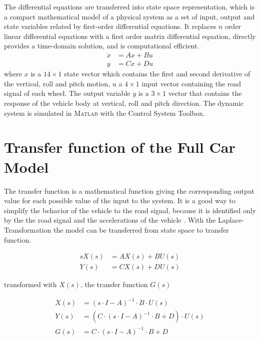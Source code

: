  The differential equations are transferred into state space representation, which is a compact mathematical model of a physical system as a set of input, output and state variables related by first-order differential equations.
 It replaces $n$ order linear differential equations with a first order matrix differential equation, directly provides a time-domain solution, and is computational efficient.
 \begin{align}
     \dot{x}&=Ax+Bu\\
     y&=Cx+Du 
 \end{align}
 where $x$ is a $14\times1$ state vector which contains the first and second derivative of the vertical, roll and pitch motion, $u$ a $4\times1$ input vector containing the road signal of each wheel. 
 The output variable $y$ is a $3\times1$ vector that contains the response of the vehicle body at vertical, roll and pitch direction.
 The dynamic system is simulated in \textsc{Matlab} with the Control System Toolbox.


 \section{Transfer function of the Full Car Model}
 \label{sec:tf}
 
 The transfer function is a mathematical function giving the corresponding output value for each possible value of the input to the system.
 It is a good way to simplify the behavior of the vehicle to the road signal, because it is identified only by the the road signal and the accelerations of the vehicle \cite{iliev2014systemansatz}.
 With the Laplace-Transformation the model can be transferred from state space to transfer function.
 
 \begin{align}
    sX(s)&=AX(s)+BU(s)\\
    Y(s)&=CX(s)+DU(s)
 \end{align}
 
 transformed with $X(s)$, the transfer function $G(s)$
 
 \begin{align}
     X(s)&=(s\cdot I - A)^{-1}\cdot B\cdot U(s) \\
     Y(s)&=(C\cdot (s\cdot I - A)^{-1}\cdot B+D)\cdot U(s) \\
     \label{equ:tf}
     G(s)&=C\cdot (s\cdot I -A)^{-1}\cdot B+D
 \end{align}
 
